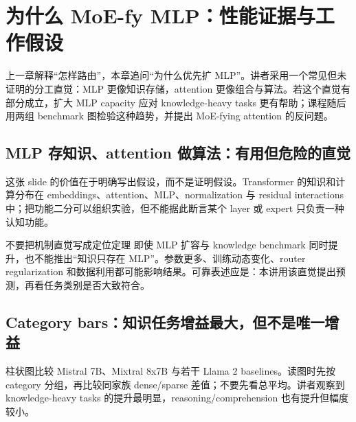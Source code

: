\section{为什么 MoE-fy MLP：性能证据与工作假设}

上一章解释“怎样路由”，本章追问“为什么优先扩 MLP”。讲者采用一个常见但未证明的分工直觉：MLP 更像知识存储，attention 更像组合与算法。若这个直觉有部分成立，扩大 MLP capacity 应对 knowledge-heavy tasks 更有帮助；课程随后用两组 benchmark 图检验这种趋势，并提出 MoE-fying attention 的反问题。

\subsection{MLP 存知识、attention 做算法：有用但危险的直觉}

这张 slide 的价值在于明确写出假设，而不是证明假设。Transformer 的知识和计算分布在 embeddings、attention、MLP、normalization 与 residual interactions 中；把功能二分可以组织实验，但不能据此断言某个 layer 或 expert 只负责一种认知功能。


\begin{warningbox}{不要把机制直觉写成定位定理}
即使 MLP 扩容与 knowledge benchmark 同时提升，也不能推出“知识只存在 MLP”。参数更多、训练动态变化、router regularization 和数据利用都可能影响结果。可靠表述应是：本讲用该直觉提出预测，再看任务类别是否大致符合。
\end{warningbox}


\subsection{Category bars：知识任务增益最大，但不是唯一增益}

柱状图比较 Mistral 7B、Mixtral 8x7B 与若干 Llama 2 baselines。读图时先按 category 分组，再比较同家族 dense/sparse 差值；不要先看总平均。讲者观察到 knowledge-heavy tasks 的提升最明显，reasoning/comprehension 也有提升但幅度较小。


